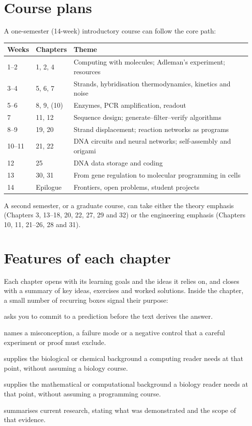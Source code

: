 \section*{Course plans}
A one-semester (14-week) introductory course can follow the core path:
\begin{center}
\small\sffamily
\begin{tabular}{@{}lll@{}}
\toprule
Weeks & Chapters & Theme\\
\midrule
1--2 & 1, 2, 4 & Computing with molecules; Adleman's experiment; resources\\
3--4 & 5, 6, 7 & Strands, hybridisation thermodynamics, kinetics and noise\\
5--6 & 8, 9, (10) & Enzymes, PCR amplification, readout\\
7 & 11, 12 & Sequence design; generate--filter--verify algorithms\\
8--9 & 19, 20 & Strand displacement; reaction networks as programs\\
10--11 & 21, 22 & DNA circuits and neural networks; self-assembly and origami\\
12 & 25 & DNA data storage and coding\\
13 & 30, 31 & From gene regulation to molecular programming in cells\\
14 & Epilogue & Frontiers, open problems, student projects\\
\bottomrule
\end{tabular}
\end{center}
A second semester, or a graduate course, can take either the theory emphasis
(Chapters 3, 13--18, 20, 22, 27, 29 and 32) or the engineering emphasis
(Chapters 10, 11, 21--26, 28 and 31).

\section*{Features of each chapter}
Each chapter opens with its learning goals and the ideas it relies on, and
closes with a summary of key ideas, exercises and worked solutions. Inside the
chapter, a small number of recurring boxes signal their purpose:
\begin{TryThis}
asks you to commit to a prediction before the text derives the answer.
\end{TryThis}
\begin{Pitfall}
names a misconception, a failure mode or a negative control that a careful
experiment or proof must exclude.
\end{Pitfall}
\begin{BioBridge}
supplies the biological or chemical background a computing reader needs at
that point, without assuming a biology course.
\end{BioBridge}
\begin{CSBridge}
supplies the mathematical or computational background a biology reader needs
at that point, without assuming a programming course.
\end{CSBridge}
\begin{Frontier}
summarises current research, stating what was demonstrated and the scope of
that evidence.
\end{Frontier}

